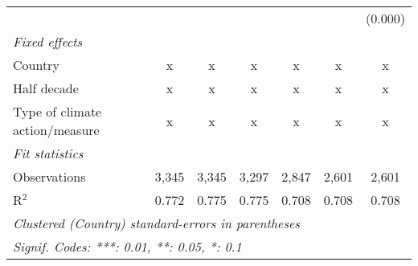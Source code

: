 \begin{tabular}{lcccccc}
                                                   &               &               &               &              &               & (0.000)\\   
   \emph{Fixed effects}\\
   Country                                         & x             & x             & x             & x            & x             & x\\  
   Half decade                                     & x             & x             & x             & x            & x             & x\\  
   Type of climate action/measure                  & x             & x             & x             & x            & x             & x\\  
   \midrule \emph{Fit statistics}\\
   Observations                                    & 3,345         & 3,345         & 3,297         & 2,847        & 2,601         & 2,601\\  
   R$^2$                                           & 0.772         & 0.775         & 0.775         & 0.708        & 0.708         & 0.708\\  
   \midrule
   \multicolumn{7}{l}{\emph{Clustered (Country) standard-errors in parentheses}}\\
   \multicolumn{7}{l}{\emph{Signif. Codes: ***: 0.01, **: 0.05, *: 0.1}}\\
\end{tabular}
\par\endgroup



